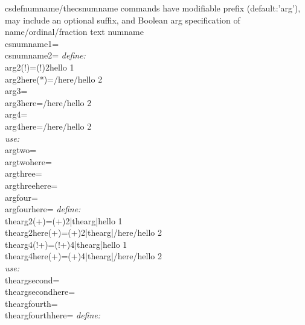 {%
     csdefnumname/thecsnumname commands have modifiable prefix (default:'arg'), may include an optional suffix, and Boolean arg specification of name/ordinal/fraction text numname\\
    csnumname1=\\%
    csnumname2=%
    \emph{define:}\\
    arg2(!)=\csdefnumname(!){2}{hello 1}\\%
    arg2here(*)=/here/{hello 2}\\%
    arg3=\\%
    arg3here=/here/{hello 2}\\%
    arg4=\\%
    arg4here=/here/{hello 2}\\%
    \emph{use:}\\
    argtwo=\\
    argtwohere=\\
    argthree=\\%
    argthreehere=\\%
    argfour=\\
    argfourhere=
    \emph{define:}\\
    thearg2(+)=\csdefnumname(+){2}|thearg|{hello 1}\\%
    thearg2here(+)=\csdefnumname(+){2}|thearg|/here/{hello 2}\\%
    thearg4(!+)=\csdefnumname(!+){4}|thearg|{hello 1}\\%
    thearg4here(+)=\csdefnumname(+){4}|thearg|/here/{hello 2}\\%
    \emph{use:}\\
    theargsecond=\\
    theargsecondhere=\\
    theargfourth=\\
    theargfourthhere=
    \emph{define:}\\
}
